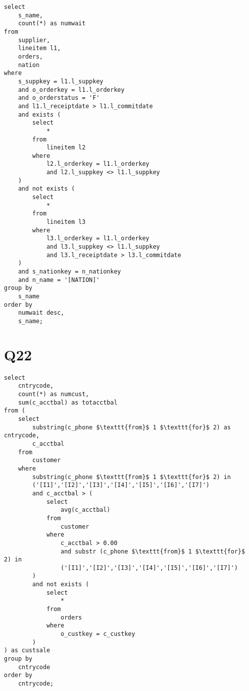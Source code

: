 \begin{lstlisting}
select
	s_name,
	count(*) as numwait
from
	supplier,
	lineitem l1,
	orders,
	nation
where
	s_suppkey = l1.l_suppkey
	and o_orderkey = l1.l_orderkey
	and o_orderstatus = 'F'
	and l1.l_receiptdate > l1.l_commitdate
	and exists (
		select
			*
		from
			lineitem l2
		where
			l2.l_orderkey = l1.l_orderkey
			and l2.l_suppkey <> l1.l_suppkey
	)
	and not exists (
		select
			*
		from
			lineitem l3
		where
			l3.l_orderkey = l1.l_orderkey
			and l3.l_suppkey <> l1.l_suppkey
			and l3.l_receiptdate > l3.l_commitdate
	)
	and s_nationkey = n_nationkey
	and n_name = '[NATION]'
group by
	s_name
order by
	numwait desc,
	s_name;
\end{lstlisting}

\section*{Q22}
\label{sec:Q22}

\begin{lstlisting}
select
	cntrycode,
	count(*) as numcust,
	sum(c_acctbal) as totacctbal
from (
	select
		substring(c_phone $\texttt{from}$ 1 $\texttt{for}$ 2) as cntrycode,
		c_acctbal
	from
		customer
	where
		substring(c_phone $\texttt{from}$ 1 $\texttt{for}$ 2) in
		('[I1]','[I2]','[I3]','[I4]','[I5]','[I6]','[I7]')
		and c_acctbal > (
			select
				avg(c_acctbal)
			from
				customer
			where
				c_acctbal > 0.00
				and substr (c_phone $\texttt{from}$ 1 $\texttt{for}$ 2) in
				('[I1]','[I2]','[I3]','[I4]','[I5]','[I6]','[I7]')
		)
		and not exists (
			select
				*
			from
				orders
			where
				o_custkey = c_custkey
		)
) as custsale
group by
	cntrycode
order by
	cntrycode;
\end{lstlisting}

%
%
%